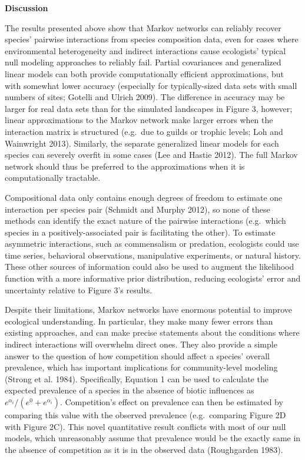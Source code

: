 \documentclass[12pt,]{article}
\begin{document}
\begin{spacing}{1.9}
\begin{flushleft}
\noindent
\textbf{Discussion}

\noindent
The results presented above show that Markov networks can reliably
recover species' pairwise interactions from species composition data,
even for cases where environmental heterogeneity and indirect
interactions cause ecologists' typical null modeling approaches to
reliably fail. Partial covariances and generalized linear models can
both provide computationally efficient approximations, but with somewhat
lower accuracy (especially for typically-sized data sets with small
numbers of sites; Gotelli and Ulrich 2009). The difference in accuracy
may be larger for real data sets than for the simulated landscapes in
Figure 3, however; linear approximations to the Markov network make
larger errors when the interaction matrix is structured (e.g.~due to
guilds or trophic levels; Loh and Wainwright 2013). Similarly, the
separate generalized linear models for each species can severely overfit
in some cases (Lee and Hastie 2012). The full Markov network should thus
be preferred to the approximations when it is computationally tractable.

Compositional data only contains enough degrees of freedom to estimate
one interaction per species pair (Schmidt and Murphy 2012), so none of
these methods can identify the exact nature of the pairwise interactions
(e.g.~which species in a positively-associated pair is facilitating the
other). To estimate asymmetric interactions, such as commensalism or
predation, ecologists could use time series, behavioral observations,
manipulative experiments, or natural history. These other sources of
information could also be used to augment the likelihood function with a
more informative prior distribution, reducing ecologists' error and
uncertainty relative to Figure 3's results.

Despite their limitations, Markov networks have enormous potential to
improve ecological understanding. In particular, they make many fewer
errors than existing approaches, and can make precise statements about
the conditions where indirect interactions will overwhelm direct ones.
They also provide a simple answer to the question of how competition
should affect a species' overall prevalence, which has important
implications for community-level modeling (Strong et al. 1984).
Specifically, Equation 1 can be used to calculate the expected
prevalence of a species in the absence of biotic influences as
\(e^{\alpha_i}/(e^{0} + e^{\alpha_i})\). Competition's effect on
prevalence can then be estimated by comparing this value with the
observed prevalence (e.g.~comparing Figure 2D with Figure 2C). This
novel quantitative result conflicts with most of our null models, which
unreasonably assume that prevalence would be the exactly same in the
absence of competition as it is in the observed data (Roughgarden 1983).


\end{flushleft}
\end{spacing}
\end{document}

